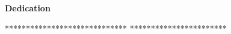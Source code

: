 \vspace{0.5cm}

\centerline{\textbf{Dedication }}
\vspace{1.5cm}

*****************************
***********************